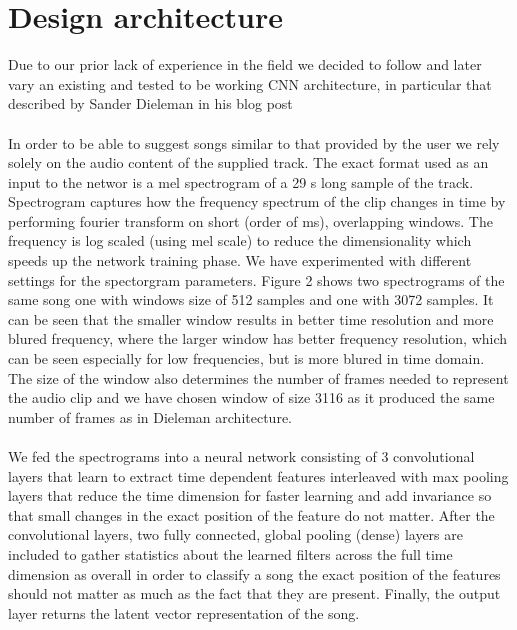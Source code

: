 \documentclass[11pt, a4paper]{article}
\begin{document}
  \section{Design architecture}
    Due to our prior lack of experience in the field we decided to follow
    and later vary an existing and tested to be working CNN architecture, in
    particular that described by Sander Dieleman in his blog post
    \cite{spotify-dieleman}
    \\ \\
    \noindent    
    In order to be able to suggest songs similar to that provided by the user
    we rely solely on the audio content of the supplied track. The exact format
    used as an input to the networ is a mel spectrogram of a 29 s long sample
    of the track. Spectrogram captures how the frequency spectrum of the clip
    changes in time by performing fourier transform on short (order of ms),
    overlapping windows. The frequency is log scaled (using mel scale) to reduce
    the dimensionality which speeds up the network training phase. We have
    experimented with different settings for the spectorgram parameters. Figure
    2 shows two spectrograms of the same song one with windows size of 512
    samples and one with 3072 samples. It can be seen that the smaller window
    results in better time resolution and more blured frequency, where the
    larger window has better frequency resolution, which can be seen especially
    for low frequencies, but is more blured in time domain. The size of the
    window also determines the number of frames needed to represent the audio
    clip and we have chosen window of size 3116 as it produced the same number
    of frames as in Dieleman architecture.
    \\ \\
    \noindent
    We fed the spectrograms into a neural network consisting of 3 convolutional
    layers that learn to extract time dependent features interleaved with
    max pooling layers that reduce the time dimension for faster learning and
    add invariance so that small changes in the exact position of the feature
    do not matter. After the convolutional layers, two fully connected, global
    pooling (dense) layers are included to gather statistics about the learned
    filters across the full time dimension as overall in order to classify a
    song the exact position of the features should not matter as much as the
    fact that they are present. Finally, the output layer returns the latent
    vector representation of the song.
    \\ \\
\end{document}
